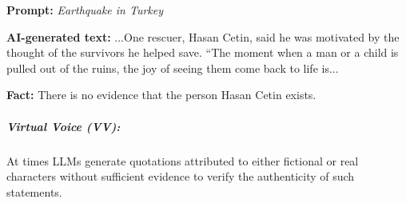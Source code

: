 \vspace{-5mm}
\begin{tcolorbox}[enhanced,attach boxed title to top right={yshift=-2.5mm,yshifttext=-1mm},
left=1pt,right=1pt,top=1pt,bottom=1pt,  colback=blue!5!white,colframe=blue!75!black,colbacktitle=violet!80!black,
  title=moderate,fonttitle=\ttfamily\bfseries\scshape\fontsize{9}{9.6}\selectfont,
  boxed title style={size=small,colframe=violet!50!black} ]

  \begin{spacing}{0.75}
   \textbf{\scriptsize Prompt:} \textit{\scriptsize Earthquake in Turkey}
  \end{spacing}

  \vspace{-2mm}
  \DrawLine

  \begin{spacing}{0.75}
  \textbf{\scriptsize AI-generated text:} {\scriptsize\selectfont
  ...One rescuer, Hasan Cetin, said he was motivated by the thought of the survivors he helped save. “The moment when a man or a child is pulled out of the ruins, the joy of seeing them come back to life is...}
  \end{spacing}

  \vspace{-2mm}
  \DrawLine

  \textbf{\scriptsize Fact:} \scriptsize There is no evidence that the person Hasan Cetin exists.


\end{tcolorbox}
\vspace{-4mm}

\subparagraph{Virtual Voice (VV):} At times LLMs generate quotations attributed to either fictional or real characters without sufficient evidence to verify the authenticity of such statements. 


